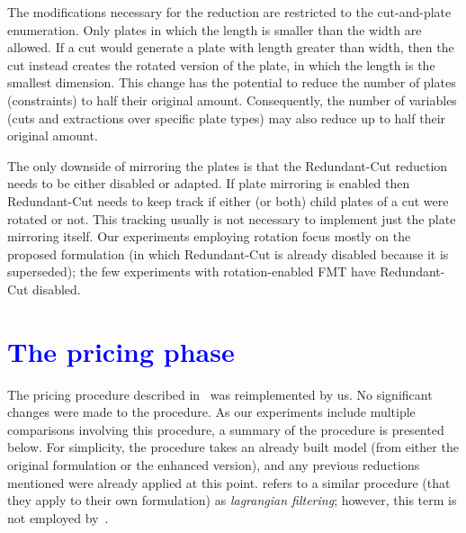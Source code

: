 \documentclass[ppgc,tese,english,formais,babel]{iiufrgs}
\newif\iffinalversion
\newcommand{\newtext}[1]{\iffinalversion%
#1%
\else%
\textcolor{blue}{#1}%
\fi%
}
\begin{document}
The modifications necessary for the reduction are restricted to the cut-and-plate enumeration.
Only plates in which the length is smaller than the width are allowed.
If a cut would generate a plate with length greater than width, then the cut instead creates the rotated version of the plate, in which the length is the smallest dimension.
This change has the potential to reduce the number of plates (constraints) to half their original amount.
Consequently, the number of variables (cuts and extractions over specific plate types) may also reduce up to half their original amount.

The only downside of mirroring the plates is that the Redundant-Cut reduction needs to be either disabled or adapted.
If plate mirroring is enabled then Redundant-Cut needs to keep track if either (or both) child plates of a cut were rotated or not.
This tracking usually is not necessary to implement just the plate mirroring itself.
Our experiments employing rotation focus mostly on the proposed formulation (in which Redundant-Cut is already disabled because it is superseded); the few experiments with rotation-enabled FMT have Redundant-Cut disabled.

\section{\newtext{The pricing phase}}
\label{sec:pricing}

The pricing procedure described in~\citet{furini:2016,dimitri_thesis} was reimplemented by us.
No significant changes were made to the procedure.
As our experiments include multiple comparisons involving this procedure, a summary of the procedure is presented below.
For simplicity, the procedure takes an already built model (from either the original formulation or the enhanced version), and any previous reductions mentioned were already applied at this point.
\citet{clautiaux:2018} refers to a similar procedure (that they apply to their own formulation) as \emph{lagrangian filtering}; however, this term is not employed by~\citet{furini:2016,dimitri_thesis}.
\end{document}
